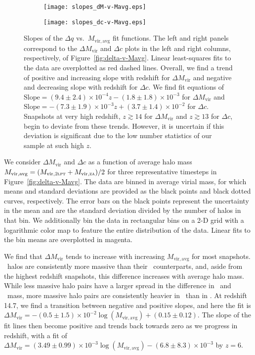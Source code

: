 \begin{figure*}[t]
	\centering
	\begin{subfigure}{}
		\texttt{[image: slopes\_dM-v-Mavg.eps]}
	\end{subfigure}
	\begin{subfigure}{}
		\texttt{[image: slopes\_dc-v-Mavg.eps]}
	\end{subfigure}
	\caption[Slopes of the $\Delta q$ vs.\ $M_{\mathrm{vir,avg}}$ fit functions.]{\footnotesize Slopes of the $\Delta q$ vs.\ $M_{\mathrm{vir,avg}}$ fit functions.  The left and right panels correspond to the $\Delta M_{\mathrm{vir}}$ and $\Delta c$ plots in the left and right columns, respectively, of Figure~\ref{fig:delta-v-Mavg}.  Linear least-squares fits to the data are overplotted as red dashed lines.  Overall, we find a trend of positive and increasing slope with redshift for $\Delta M_{\mathrm{vir}}$ and negative and decreasing slope with redshift for $\Delta c$.  We find fit equations of $\mathrm{Slope} = (9.4 \pm 2.4) \times 10^{-4} z - (1.8 \pm 1.8) \times 10^{-3}$ for $\Delta M_{\mathrm{vir}}$ and $\mathrm{Slope} = -(7.3 \pm 1.9) \times 10^{-3} z + (3.7 \pm 1.4) \times 10^{-2}$ for $\Delta c$.  Snapshots at very high redshift, $z \gtrsim 14$ for $\Delta M_{\mathrm{vir}}$ and $z \gtrsim 13$ for $\Delta c$, begin to deviate from these trends.  However, it is uncertain if this deviation is significant due to the low number statistics of our sample at such high $z$.}
	\label{fig:slopes_delta-v-Mavg}
\end{figure*}

We consider $\Delta M_{\mathrm{vir}}$ and $\Delta c$ as a function of average halo mass $M_{\mathrm{vir,avg}} = (M_{\mathrm{vir},\textsc{2lpt}} + M_{\mathrm{vir},\textsc{za}}) / 2$ for three representative timesteps in Figure~\ref{fig:delta-v-Mavg}.  The data are binned in average virial mass, for which means and standard deviations are provided as the black points and black dotted curves, respectively.  The error bars on the black points represent the uncertainty in the mean and are the standard deviation divided by the number of halos in that bin.  We additionally bin the data in rectangular bins on a 2-D grid with a logarithmic color map to feature the entire distribution of the data.  Linear fits to the bin means are overplotted in magenta.

We find that $\Delta M_{\mathrm{vir}}$ tends to increase with increasing $M_{\mathrm{vir,avg}}$ for most snapshots.  \lpt\ halos are consistently more massive than their \za\ counterparts, and, aside from the highest redshift snapshots, this difference increases with average halo mass.  While less massive halo pairs have a larger spread in the difference in \lpt\ and \za\ mass, more massive halo pairs are consistently heavier in \lpt\ than in \za.  At redshift 14.7, we find a transition between negative and positive slopes, and here the fit is $\Delta M_{\mathrm{vir}} = -(0.5 \pm 1.5) \times 10^{-2} \log(M_{\mathrm{vir,avg}}) + (0.15 \pm 0.12)$.   The slope of the fit lines then become positive and trends back towards zero as we progress in redshift, with a fit of $\Delta M_{\mathrm{vir}} = (3.49 \pm 0.99) \times 10^{-3} \log(M_{\mathrm{vir,avg}}) - (6.8 \pm 8.3) \times 10^{-3}$ by $z = 6$.


